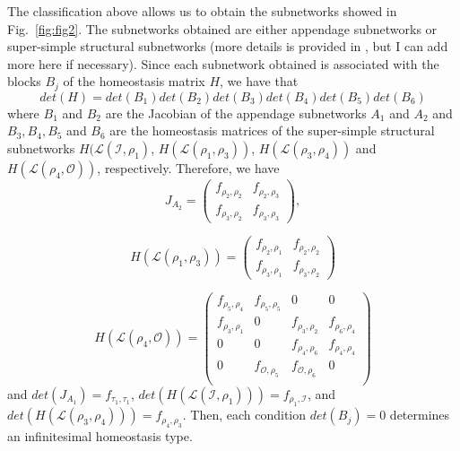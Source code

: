 The classification above allows us to obtain the subnetworks showed in Fig.~\ref{fig:fig2}.
The subnetworks obtained are either appendage subnetworks or super-simple structural subnetworks
(more details is provided in \cite{wang2021}, but I can add more here if necessary).
Since each subnetwork obtained is associated with the blocks $B_j$ of the homeostasis
matrix $H$, we have that
\begin{equation}
    det(H) = det(B_1)det(B_2)det(B_3)
    det(B_4)det(B_5)det(B_6)
\end{equation}
where $B_1$ and $B_2$ are the Jacobian of the appendage subnetworks $A_1$ and $A_2$
and $B_3, B_4, B_5$ and $B_6$ are the homeostasis matrices of the super-simple 
structural subnetworks $H(\mathcal{L}(\mathcal{I}, \rho_1)$, 
$H(\mathcal{L}(\rho_1, \rho_3))$, $H(\mathcal{L}(\rho_3, \rho_4))$ and 
$H(\mathcal{L}(\rho_4, \mathcal{O}))$, respectively. Therefore, we have 
\begin{equation}
    J_{A_2} = 
    \begin{pmatrix}
        f_{\rho_2, \rho_2} & f_{\rho_2, \rho_3} \\
        f_{\rho_3, \rho_2} & f_{\rho_3, \rho_3}
    \end{pmatrix},
\end{equation}

\begin{equation}
    H(\mathcal{L}(\rho_1, \rho_3)) = 
    \begin{pmatrix}
        f_{\rho_2, \rho_1} & f_{\rho_2, \rho_2} \\
        f_{\rho_3, \rho_1} & f_{\rho_3, \rho_2}
    \end{pmatrix}
\end{equation}

\begin{equation}
    H(\mathcal{L}(\rho_4, \mathcal{O})) = 
    \begin{pmatrix}
        f_{\rho_5, \rho_4} & f_{\rho_5, \rho_5} & 0 & 0 \\
        f_{\rho_3, \rho_1} & 0 & f_{\rho_3, \rho_2} & f_{\rho_6,\rho_4}\\
        0 & 0 & f_{\rho_4, \rho_6} & f_{\rho_4, \rho_4}\\
        0 & f_{\mathcal{O}, \rho_5} & f_{\mathcal{O}, \rho_6} & 0\\
    \end{pmatrix}
\end{equation}
and $det(J_{A_1}) = f_{\tau_1, \tau_1}$, 
$det(H(\mathcal{L}(\mathcal{I}, \rho_1))) = f_{\rho_1, \mathcal{I}}$, 
and $det(H(\mathcal{L}(\rho_3, \rho_4))) = f_{\rho_4, \rho_3}$. Then, 
each condition $det(B_j) = 0$ determines an infinitesimal homeostasis
type.

